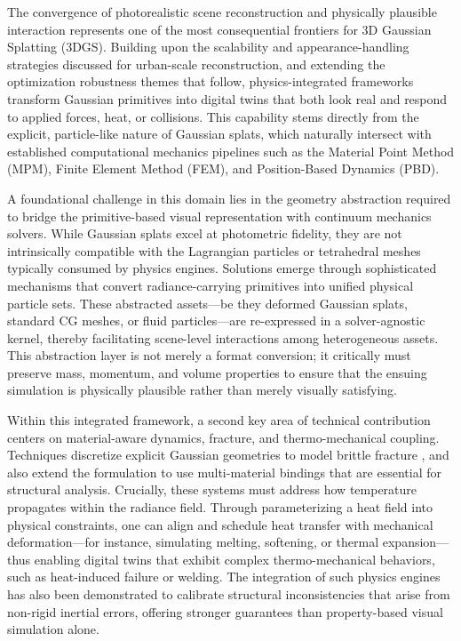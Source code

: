 \documentclass[11pt,a4paper]{article}
\begin{document}
The convergence of photorealistic scene reconstruction and physically plausible interaction represents one of the most consequential frontiers for 3D Gaussian Splatting (3DGS). Building upon the scalability and appearance-handling strategies discussed for urban-scale reconstruction, and extending the optimization robustness themes that follow, physics-integrated frameworks transform Gaussian primitives into digital twins that both look real and respond to applied forces, heat, or collisions. This capability stems directly from the explicit, particle-like nature of Gaussian splats, which naturally intersect with established computational mechanics pipelines such as the Material Point Method (MPM), Finite Element Method (FEM), and Position-Based Dynamics (PBD).

A foundational challenge in this domain lies in the geometry abstraction required to bridge the primitive-based visual representation with continuum mechanics solvers. While Gaussian splats excel at photometric fidelity, they are not intrinsically compatible with the Lagrangian particles or tetrahedral meshes typically consumed by physics engines. Solutions emerge through sophisticated mechanisms that convert radiance-carrying primitives into unified physical particle sets. These abstracted assets---be they deformed Gaussian splats, standard CG meshes, or fluid particles---are re-expressed in a solver-agnostic kernel, thereby facilitating scene-level interactions among heterogeneous assets. This abstraction layer is not merely a format conversion; it critically must preserve mass, momentum, and volume properties to ensure that the ensuing simulation is physically plausible rather than merely visually satisfying.

Within this integrated framework, a second key area of technical contribution centers on material-aware dynamics, fracture, and thermo-mechanical coupling. Techniques discretize explicit Gaussian geometries to model brittle fracture \cite{arxiv:2505.05587v1}, and also extend the formulation to use multi-material bindings that are essential for structural analysis. Crucially, these systems must address how temperature propagates within the radiance field. Through parameterizing a heat field into physical constraints, one can align and schedule heat transfer with mechanical deformation---for instance, simulating melting, softening, or thermal expansion---thus enabling digital twins that exhibit complex thermo-mechanical behaviors, such as heat-induced failure or welding. The integration of such physics engines has also been demonstrated to calibrate structural inconsistencies that arise from non-rigid inertial errors, offering stronger guarantees than property-based visual simulation alone.
\end{document}
